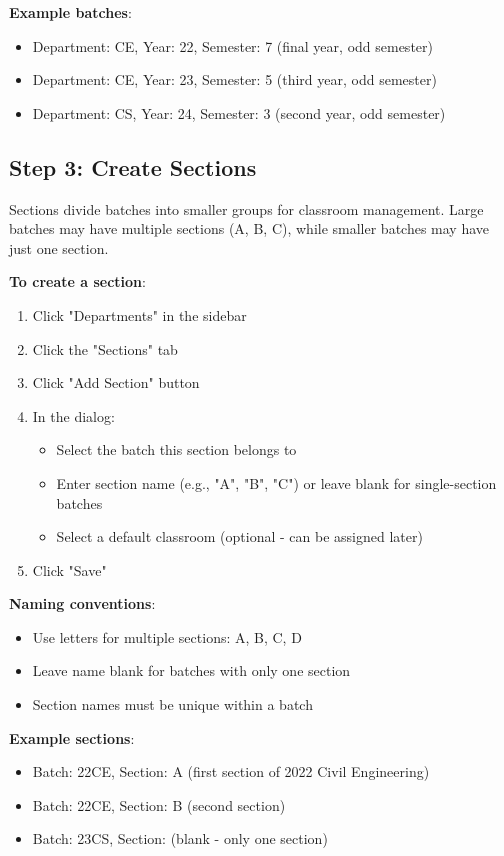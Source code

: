 \documentclass[12pt,a4paper]{article}
\begin{document}
\textbf{Example batches}:
\begin{itemize}
\item Department: CE, Year: 22, Semester: 7 (final year, odd semester)
\item Department: CE, Year: 23, Semester: 5 (third year, odd semester)
\item Department: CS, Year: 24, Semester: 3 (second year, odd semester)
\end{itemize}


\subsection{Step 3: Create Sections}

Sections divide batches into smaller groups for classroom management. Large batches may have multiple sections (A, B, C), while smaller batches may have just one section.

\textbf{To create a section}:
\begin{enumerate}
\item Click "Departments" in the sidebar
\item Click the "Sections" tab
\item Click "Add Section" button
\item In the dialog:
\begin{itemize}
\item Select the batch this section belongs to
\item Enter section name (e.g., "A", "B", "C") or leave blank for single-section batches
\item Select a default classroom (optional - can be assigned later)
\end{itemize}
\item Click "Save"
\end{enumerate}

\textbf{Naming conventions}:
\begin{itemize}
\item Use letters for multiple sections: A, B, C, D
\item Leave name blank for batches with only one section
\item Section names must be unique within a batch
\end{itemize}

\textbf{Example sections}:
\begin{itemize}
\item Batch: 22CE, Section: A (first section of 2022 Civil Engineering)
\item Batch: 22CE, Section: B (second section)
\item Batch: 23CS, Section: (blank - only one section)
\end{itemize}
\end{document}
